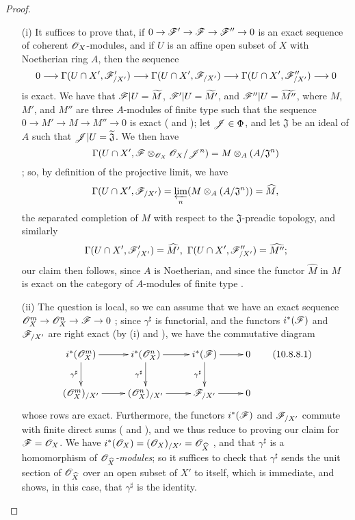 \begin{proof}
\medskip\noindent
\begin{enumerate}
  \item[\rm{(i)}] It suffices to prove that, if $0\to\sh{F}'\to\sh{F}\to\sh{F}''\to 0$ is an exact sequence of coherent $\mathscr{O}_X$-modules, and if $U$ is an affine open subset of $X$ with Noetherian ring $A$, then the sequence
\[
  0\to\Gamma(U\cap X',\sh{F}_{/X'}')\to\Gamma(U\cap X',\sh{F}_{/X'})\to\Gamma(U\cap X',\sh{F}_{/X'}'')\to 0
\]
is exact.
We have that $\mathscr{F}|U=\widetilde{M}$, $\mathscr{F}'|U=\widetilde{M'}$, and $\mathscr{F}''|U=\widetilde{M''}$, where $M$, $M'$, and $M''$ are three $A$-modules of finite type such that the sequence $0\to M'\to M\to M''\to 0$ is exact ( and ); let $\mathscr{J}\in\Phi$, and let $\mathfrak{J}$ be an ideal of $A$ such that $\mathscr{J}|U=\widetilde{\mathfrak{J}}$.
We then have
\[
  \Gamma(U\cap X',\mathscr{F}\otimes_{\mathscr{O}_X}\mathscr{O}_X/\mathscr{J}^n)=M\otimes_A(A/\mathfrak{J}^n)
\]
; so, by definition of the projective limit, we have
\[
  \Gamma(U\cap X',\mathscr{F}_{/X'})=\varprojlim_n(M\otimes_A(A/\mathfrak{J}^n))=\widehat{M},
\]
the separated completion of $M$ with respect to the $\mathfrak{J}$-preadic topology, and similarly
\[
  \Gamma(U\cap X',\mathscr{F}_{/X'}')=\widehat{M'},\ \Gamma(U\cap X',\mathscr{F}_{/X'}'')=\widehat{M''};
\]
our claim then follows, since $A$ is Noetherian, and since the functor $\widehat{M}$ in $M$ is exact on the category of $A$-modules of finite type .
  \item[\rm{(ii)}] The question is local, so we can assume that we have an exact sequence $\sh{O}_X^m\to\sh{O}_X^n\to\sh{F}\to 0$ ; since $\gamma^\sharp$ is functorial, and the functors $i^*(\mathscr{F})$ and $\mathscr{F}_{/X'}$ are right exact (by (i) and ), we have the commutative diagram
\[
\label{I.10.8.8.1}
  \xymatrix{
    i^*(\sh{O}_X^m)\ar[r]\ar[d]_{\gamma^\sharp} &
    i^*(\sh{O}_X^n)\ar[r]\ar[d]_{\gamma^\sharp} &
    i^*(\sh{F})\ar[r]\ar[d]_{\gamma^\sharp} &
    0\\
    (\sh{O}_X^m)_{/X'}\ar[r] &
    (\sh{O}_X^n)_{/X'}\ar[r] &
    \sh{F}_{/X'}\ar[r] &
    0
  }
  \tag{10.8.8.1}
\]
whose rows are exact.
Furthermore, the functors $i^*(\mathscr{F})$ and $\mathscr{F}_{/X'}$ commute with finite direct sums ( and ), and we thus reduce to proving our claim for $\mathscr{F}=\mathscr{O}_X$.
We have $i^*(\mathscr{O}_X)=(\mathscr{O}_X)_{/X'}=\mathscr{O}_{\widehat{X}}$ , and that $\gamma^\sharp$ is a homomorphism of \emph{$\mathscr{O}_{\widehat{X}}$-modules}; so it suffices to check that $\gamma^\sharp$ sends the unit section of $\mathscr{O}_{\widehat{X}}$ over an open subset of $X'$ to itself, which is immediate, and shows, in this case, that $\gamma^\sharp$ is the identity.
\end{enumerate}
\end{proof}

